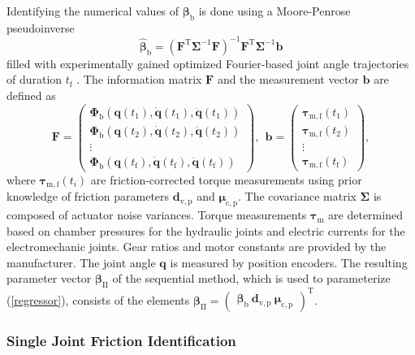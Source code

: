 Identifying the numerical values of $\bm{\beta}_{\mathrm{b}}$ is done using a Moore-Penrose pseudoinverse 
%
\begin{equation}
\hat{\bm{\beta}}_{\mathrm{b}} = {\left( \bm{F}^{\mathrm{T}} \bm{\Sigma}^{-1} \bm{F} \right)}^{-1}  \bm{F}^{\mathrm{T}} \bm{\Sigma}^{-1}\bm{b}
\label{MoorePenrose}
\end{equation}
%
filled with experimentally gained optimized Fourier-based joint angle trajectories of duration $t_{\mathrm{f}}$ \cite{park2006fourier}. 
The information matrix $\bm{F}$ and the measurement vector $\bm{b}$ are defined as
%
\begin{equation}
\bm{F} = \begin{pmatrix}
\bm{\Phi}_{\mathrm{b}}\left( \bm{q}(t_1),\dot{\bm{q}}(t_1),\ddot{\bm{q}}(t_1) \right) \\
\bm{\Phi}_{\mathrm{b}}\left( \bm{q}(t_2),\dot{\bm{q}}(t_2),\ddot{\bm{q}}(t_2) \right) \\
\vdots \\
\bm{\Phi}_{\mathrm{b}}(\bm{q}(t_{\mathrm{f}}),\dot{\bm{q}}(t_{\mathrm{f}}),\ddot{\bm{q}}(t_{\mathrm{f}}))\end{pmatrix},~~
\bm{b} = \begin{pmatrix}
\bm{\tau}_\mathrm{m,f}(t_1) \\
\bm{\tau}_\mathrm{m,f}(t_2) \\
\vdots \\
\bm{\tau}_\mathrm{m,f}(t_{\mathrm{f}})
\end{pmatrix},
\end{equation}
%
where $\bm{\tau}_\mathrm{m,f}(t_i)$ are friction-corrected torque measurements using prior knowledge of friction parameters $\bm{d}_\mathrm{v,p}$ and $\bm{\mu}_\mathrm{c,p}$.
The covariance matrix $\bm{\Sigma}$ is composed of actuator noise variances.
Torque measurements $\bm{\tau}_{\mathrm{m}}$ are determined based on chamber pressures for the hydraulic joints and electric currents for the electromechanic joints.
Gear ratios and motor constants are provided by the manufacturer.
The joint angle $\bm{q}$ is measured by position encoders. 
The resulting parameter vector $\bm{\beta}_{\mathrm{II}}$ of the sequential method, which is used to parameterize (\ref{regressor}), consists of the elements $\bm{\beta}_{\mathrm{II}} = \begin{pmatrix} \bm{\beta}_\mathrm{b} \ \bm{d}_\mathrm{v,p} \ \bm{\mu}_\mathrm{c,p} \end{pmatrix}^{\mathrm{T}}$.

\subsubsection{Single Joint Friction Identification}

